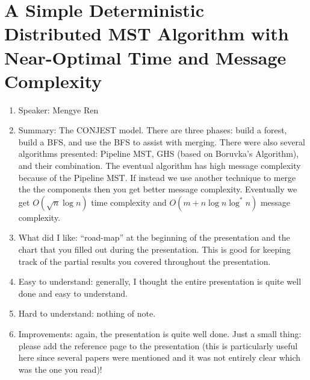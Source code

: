 \documentclass[twoside]{article}
\begin{document}
\section{A Simple Deterministic Distributed MST Algorithm with Near-Optimal Time and Message Complexity}
\begin{enumerate}
\item Speaker: Mengye Ren 
\item Summary: The CONJEST model. There are three phases: build a forest, build a BFS, and use the BFS to assist with merging. There were also several algorithms presented: Pipeline MST, GHS (based on Boruvka's Algorithm), and their combination. The eventual algorithm has high message complexity because of the Pipeline MST. If instead we use another technique to merge the the components then you get better message complexity. Eventually we get $O(\sqrt{n}\log n)$ time complexity and $O(m + n\log n\log ^* n)$ message complexity.   
\item What did I like: ``road-map'' at the beginning of the presentation and the chart that you filled out during the presentation. This is good for keeping track of the partial results you covered throughout the presentation. 
\item Easy to understand: generally, I thought the entire presentation is quite well done and easy to understand. 
\item Hard to understand: nothing of note. 
\item Improvements: again, the presentation is quite well done. Just a small thing: please add the reference page to the presentation (this is particularly useful here since several papers were mentioned and it was not entirely clear which was the one you read)! 
\end{enumerate}

\begin{comment}
\section{}
\begin{enumerate}
\item Speaker:
\item Summary: 
\item What did I like: 
\item Easy to understand:
\item Hard to understand:
\item Improvements:
\end{enumerate}
\end{comment}
\end{document}
